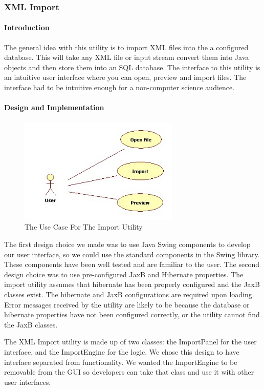 \subsubsection{XML Import}
\paragraph{Introduction}

The general idea with this utility is to import XML files into the a configured database. This will take any XML file or input stream convert them into Java objects and then store them into an SQL database. The interface to this utility is an intuitive user interface where you can open, preview and import files. The interface had to be intuitive enough for a non-computer science audience. 


\paragraph{Design and Implementation}
\begin{figure}[h]
	\centering
		\includegraphics[width=3.00in]{Images/ImportUse.jpg}
	\caption{The Use Case For The Import Utility}
	\label{fig:Import Use}
\end{figure}
\par
The first design choice we made was to use Java Swing components to develop our user interface, so we could use the standard components in the Swing library. These components have been well tested and are familiar to the user. The second design choice was to use pre-configured JaxB and Hibernate properties. The import utility assumes that hibernate has been properly configured and the JaxB classes exist. The hibernate and JaxB configurations are required upon loading. Error messages received by the utility are likely to be because the database or hibernate properties have not been configured correctly, or the utility cannot find the JaxB classes. 
\par
The XML Import utility is made up of two classes: the ImportPanel for the user interface, and the ImportEngine for the logic. We chose this design to have interface separated from functionality. We wanted the ImportEngine to be removable from the GUI so developers can take that class and use it with other user interfaces. 
